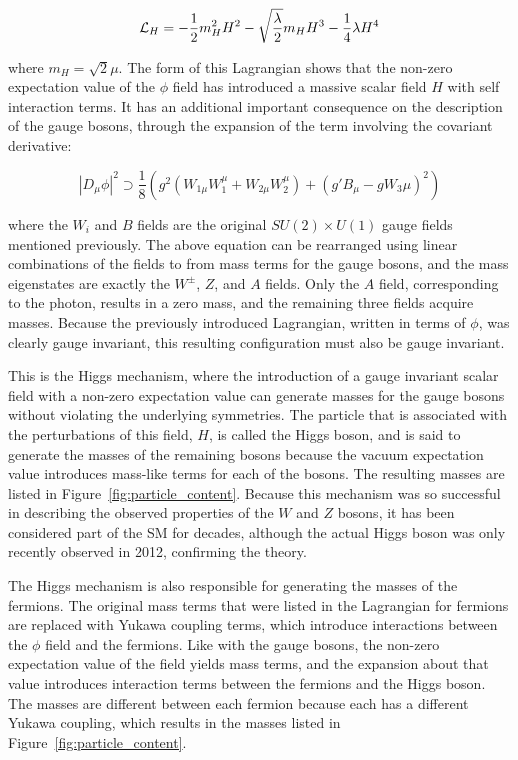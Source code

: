 \begin{equation}
  \mathcal{L}_{H} = -\frac{1}{2}m_H^2 H^2 - \sqrt{\frac{\lambda}{2}}m_H H^3 - \frac{1}{4}\lambda H^4
\end{equation}

\noindent where $m_H = \sqrt{2}\mu$.
The form of this Lagrangian shows that the non-zero expectation value of the $\phi$ field has introduced a massive scalar field $H$ with self interaction terms.
It has an additional important consequence on the description of the gauge bosons, through the expansion of the term involving the covariant derivative:

\begin{equation}
  |D_\mu\phi|^2 \supset \frac{1}{8}\left(g^2(W_{1\mu}W_1^\mu + W_{2\mu}W_2^\mu) + (g'B_\mu - gW_3{\mu})^2\right)
\end{equation}

where the $W_i$ and $B$ fields are the original $SU(2)\times U(1)$ gauge fields mentioned previously.
The above equation can be rearranged using linear combinations of the fields to from mass terms for the gauge bosons, and the mass eigenstates are exactly the $W^\pm$, $Z$, and $A$ fields.
Only the $A$ field, corresponding to the photon, results in a zero mass, and the remaining three fields acquire masses.
Because the previously introduced Lagrangian, written in terms of $\phi$, was clearly gauge invariant, this resulting configuration must also be gauge invariant.

This is the Higgs mechanism, where the introduction of a gauge invariant scalar field with a non-zero expectation value can generate masses for the gauge bosons without violating the underlying symmetries.
The particle that is associated with the perturbations of this field, $H$, is called the Higgs boson, and is said to generate the masses of the remaining bosons because the vacuum expectation value introduces mass-like terms for each of the bosons.
The resulting masses are listed in Figure~\ref{fig:particle_content}.
Because this mechanism was so successful in describing the observed properties of the $W$ and $Z$ bosons, it has been considered part of the \ac{SM} for decades, although the actual Higgs boson was only recently observed in 2012, confirming the theory.

The Higgs mechanism is also responsible for generating the masses of the fermions.
The original mass terms that were listed in the Lagrangian for fermions are replaced with Yukawa coupling terms, which introduce interactions between the $\phi$ field and the fermions.
Like with the gauge bosons, the non-zero expectation value of the field yields mass terms, and the expansion about that value introduces interaction terms between the fermions and the Higgs boson.
The masses are different between each fermion because each has a different Yukawa coupling, which results in the masses listed in Figure~\ref{fig:particle_content}.

